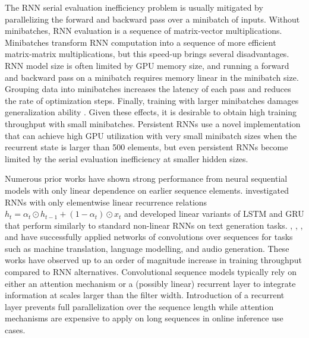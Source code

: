 \documentclass{article}
\begin{document}
The RNN serial evaluation inefficiency problem is usually mitigated by
parallelizing the forward and backward pass over a minibatch of inputs. Without
minibatches, RNN evaluation is a sequence of matrix-vector
multiplications. Minibatches transform RNN computation into a sequence of more
efficient matrix-matrix multiplications, but this speed-up brings several
disadvantages.  RNN model size is often limited by GPU memory size, and running
a forward and backward pass on a minibatch requires memory linear in the
minibatch size.  Grouping data into minibatches increases the latency of each
pass and reduces the rate of optimization steps. Finally, training with larger
minibatches damages generalization ability \cite{keskar2017large}. Given these
effects, it is desirable to obtain high training throughput with small minibatches.
Persistent RNNs \cite{diamos2016persistent} use a novel
implementation that can achieve high GPU utilization with very small minibatch
sizes when the recurrent state is larger than 500 elements, but even persistent
RNNs become limited by the serial evaluation inefficiency at smaller hidden
sizes.

Numerous prior works have shown strong performance from neural sequential models
with only linear dependence on earlier sequence
elements. \citet{balduzzi2016strongly} investigated RNNs with only elementwise
linear recurrence relations $h_t = \alpha_t \odot h_{t-1} + (1-\alpha_t) \odot
x_t$ and developed linear variants of LSTM and GRU that perform similarly to
standard non-linear RNNs on text generation tasks. \citet{bradbury2017quasi},
\citet{kalchbrenner2016neural}, \citet{gehring2017convolutional}, and
\citet{van2016wavenet} have successfully applied networks of convolutions over
sequences for tasks such as machine translation, language modelling, and audio
generation.  These works have observed up to an order of magnitude increase in
training throughput compared to RNN alternatives. Convolutional sequence models
typically rely on either an attention mechanism or a (possibly linear) recurrent
layer to integrate information at scales larger than the filter
width. Introduction of a recurrent layer prevents full parallelization over the
sequence length while attention mechanisms are expensive to apply on long
sequences in online inference use cases.
\end{document}
